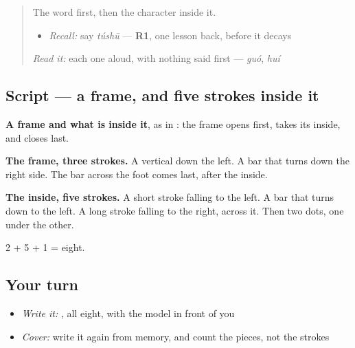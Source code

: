 \label{lesson:ZH-W454-tu-chart}



\begin{quote}
The word first, then the character inside it.

\begin{itemize}
\raggedright
  \item \emph{Recall:} say \emph{túshū} — \textbf{R1}, one lesson back, before it decays
\end{itemize}

\begin{quote}
 
\end{quote}

\emph{Read it:} each one aloud, with nothing said first — \emph{guó}, \emph{huí}
\end{quote}

\subsection*{Script — a frame, and five strokes inside it}

\begin{quote}
\end{quote}

\textbf{A frame and what is inside it}, as in : the frame opens first, takes its inside, and closes last.

\textbf{The frame, three strokes.} A vertical down the left. A bar that turns down the right side. The bar across the foot comes last, after the inside.

\textbf{The inside, five strokes.} A short stroke falling to the left. A bar that turns down to the left. A long stroke falling to the right, across it. Then two dots, one under the other.

2 + 5 + 1 = eight.

\subsection*{Your turn}
\begin{itemize}
\raggedright
  \item \emph{Write it:} , all eight, with the model in front of you
  \item \emph{Cover:} write it again from memory, and count the pieces, not the strokes
\end{itemize}

